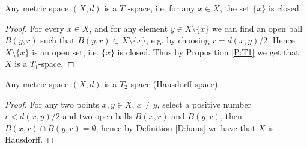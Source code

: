 \begin{corollary} \label{C:metric_T1}
Any metric space $(X,d)$ is a $T_1$-space, i.e. for any $x\in X$, the set 
$\{x\}$ is closed.
\end{corollary}
\begin{proof}
For every $x\in X$, and for any element $y\in X\setminus \{x\}$ we can find an 
open ball $B(y,r)$ such that $B(y,r)\subset X\setminus \{x\}$, e.g. by choosing
$r=d(x,y)/2$. Hence $X\setminus \{x\}$ is an open set, i.e. $\{x\}$ is closed. 
Thus by Proposition \ref{P:T1} we get that $X$ is a $T_1$-space.
\end{proof}

\begin{corollary} \label{C:metric_T2}
Any metric space $(X,d)$ is a $T_2$-space (Hausdorff space).
\end{corollary}
\begin{proof}
For any two points $x,y\in X$, $x\neq y$, select a positive number $r<d(x,y)/2$
and two open balls $B(x,r)$ and $B(y,r)$, then $B(x,r)\cap B(y,r)=\emptyset$,
hence by Definition \ref{D:haus} we have that $X$ is Hausdorff.
\end{proof}

